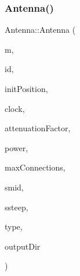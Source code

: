 \subsubsection{\texorpdfstring{Antenna()}{Antenna()}\hspace{0.1cm}{\footnotesize\ttfamily [1/2]}}
{\footnotesize\ttfamily Antenna\+::\+Antenna (\begin{DoxyParamCaption}\item[{const \hyperlink{class_map}{Map} $\ast$}]{m,  }\item[{const unsigned long}]{id,  }\item[{Point $\ast$}]{init\+Position,  }\item[{const \hyperlink{class_clock}{Clock} $\ast$}]{clock,  }\item[{double}]{attenuation\+Factor,  }\item[{double}]{power,  }\item[{unsigned long}]{max\+Connections,  }\item[{double}]{smid,  }\item[{double}]{ssteep,  }\item[{\hyperlink{_antenna_type_8h_a7b678b5cb9dedc607131200119d96b16}{Antenna\+Type}}]{type,  }\item[{string \&}]{output\+Dir }\end{DoxyParamCaption})\hspace{0.3cm}{\ttfamily [explicit]}}

